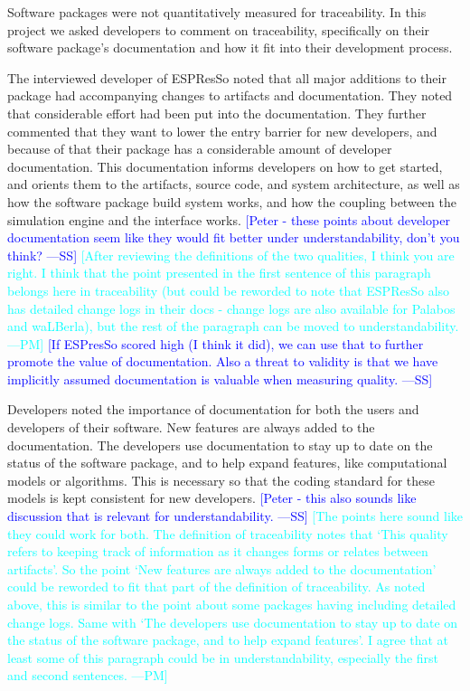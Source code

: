 \documentclass[final, 3p, times, authoryear]{elsarticle}
\newcommand{\authornote}[3]{\textcolor{#1}{[#3 ---#2]}}
\newcommand{\authornote}[3]{}
\newcommand{\wss}[1]{\authornote{blue}{SS}{#1}} %
\newcommand{\pmm}[1]{\authornote{cyan}{PM}{#1}} %
\begin{document}
Software packages were not quantitatively measured for traceability. In this
project we asked developers to comment on traceability, specifically on their
software package's documentation and how it fit into their development process. 

The interviewed developer of ESPResSo noted that all major additions to their
package had accompanying changes to artifacts and documentation. They noted that
considerable effort had been put into the documentation. They further commented
that they want to lower the entry barrier for new developers, and because of
that their package has a considerable amount of developer documentation. This
documentation informs developers on how to get started, and orients them to the
artifacts, source code, and system architecture, as well as how the software
package build system works, and how the coupling between the simulation engine
and the interface works.  \wss{Peter - these points about developer
documentation seem like they would fit better under understandability, don't you
think?}  \pmm{After reviewing the definitions of the two qualities, I think you
are right. I think that the point presented in the first sentence of this
paragraph belongs here in traceability (but could be reworded to note that
ESPResSo also has detailed change logs in their docs - change logs are also
available for Palabos and waLBerla), but the rest of the paragraph can be moved
to understandability.} \wss{If ESPresSo scored high (I think it did), we can use
that to further promote the value of documentation.  Also a threat to validity
is that we have implicitly assumed documentation is valuable when measuring
quality.}

Developers noted the importance of documentation for both the users and
developers of their software. New features are always added to the
documentation. The developers use documentation to stay up to date on the status
of the software package, and to help expand features, like computational models
or algorithms. This is necessary so that the coding standard for these models is
kept consistent for new developers. \wss{Peter - this also sounds like
discussion that is relevant for understandability.} \pmm{The points here sound
like they could work for both. The definition of traceability notes that `This
quality refers to keeping track of information as it changes forms or relates
between artifacts'. So the point `New features are always added to the
documentation' could be reworded to fit that part of the definition of
traceability. As noted above, this is similar to the point about some packages
having including detailed change logs. Same with `The developers use
documentation to stay up to date on the status of the software package, and to
help expand features'. I agree that at least some of this paragraph could be in
understandability, especially the first and second sentences.}
\end{document}
